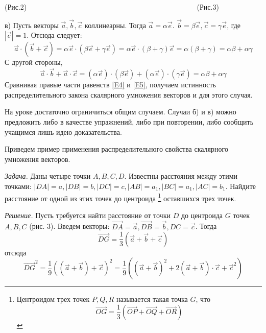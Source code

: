 \documentclass{article}
\begin{document}
(Рис.2)$\hspace{10cm}$(Рис.3)
\par в) Пусть векторы $\overrightarrow{a},\overrightarrow{b},\overrightarrow{c}$ коллинеарны. Тогда $\overrightarrow{a}=\alpha\overrightarrow{e}$. $\overrightarrow{b}=\beta\overrightarrow{e},\overrightarrow{c}=\gamma\overrightarrow{e}$, где $|\overrightarrow{e}|=1$. Отсюда следует:
\begin{equation}\label{E4}
\overrightarrow{a}\cdot(\overrightarrow{b}+\overrightarrow{c})=\alpha\overrightarrow{e}\cdot(\beta\overrightarrow{e}+\gamma\overrightarrow{e})=\alpha\overrightarrow{e}\cdot(\beta+\gamma)\overrightarrow{e}=\alpha(\beta+\gamma)=\alpha\beta+\alpha\gamma
\end{equation}
С другой стороны,
\begin{equation}\label{E5}
\overrightarrow{a}\cdot\overrightarrow{b}+\overrightarrow{a}\cdot\overrightarrow{c}=(\alpha\overrightarrow{e})\cdot(\beta\overrightarrow{e})+(\alpha\overrightarrow{e})\cdot(\gamma\overrightarrow{e})=\alpha\beta+\alpha\gamma
\end{equation}
Сравнивая правые части равенств \eqref{E4} и \eqref{E5}, получаем истинность распределительного закона скалярного умножения векторов и для этого случая.
\par На уроке достаточно ограничиться общим случаем. Случаи б) и в) можно предложить либо в качестве упражнений, либо при повторении, либо сообщить учащимся лишь идею доказательства.
\par Приведем пример применения распределительного свойства скалярного умножения векторов.
\par \textit{Задача.} Даны четыре точки $A,B,C,D$. Известны расстояния между этими точками: $|DA|=a,|DB|=b,|DC|=c,|AB|=a_1,|BC|=a_1,|AC|=b_1$. Найдите расстояние от одной из этих точек до центроида \footnote[1]{Центроидом трех точек $P,Q,R$ называется такая точка $G$, что $$\overrightarrow{OG}=\frac{1}{3}(\overrightarrow{OP}+\overrightarrow{OQ}+\overrightarrow{OR})$$} оставшихся трех точек.
\par\textit{Решение.} Пусть требуется найти расстояние от точки $D$ до центроида $G$ точек $A,B,C$ (рис. 3). Введем векторы: $\overrightarrow{DA}=\overrightarrow{a},\overrightarrow{DB}=\overrightarrow{b},DC=\overrightarrow{c}$. Тогда
$$\overrightarrow{DG}=\frac{1}{3}(\overrightarrow{a}+\overrightarrow{b}+\overrightarrow{c})$$
отсюда 
$$\overrightarrow{DG}^2=\frac{1}{9}((\overrightarrow{a}+\overrightarrow{b})+\overrightarrow{c})^2=\frac{1}{9}((\overrightarrow{a}+\overrightarrow{b})^2+2(\overrightarrow{a}+\overrightarrow{b})\cdot\overrightarrow{c}+\overrightarrow{c}^2)$$
\end{document}
